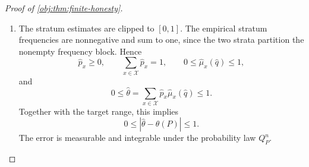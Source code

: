 \documentclass[11pt]{article}
\begin{document}
\begin{proof}[Proof of \cref{obj:thm:finite-honesty}]
\begin{enumerate}
The selection rule in \cref{obj:def:total-estimator} gives
\[
\widehat q\in\mathcal D_{n,\sigma},
\qquad
A_{\widehat q}(K)\le A_q(K)
\quad\text{for every }q\in\mathcal D_{n,\sigma}.
\]
By the admissibility assertion of \cref{obj:lem:dictionary-score-rate}, the selected pair satisfies the measurability and pointwise inversion conditions, together with
\[
\widehat q(t)\ge0\quad(t\in[-1/2,1/2]),
\qquad
0<I_\kappa(\widehat q)<\infty,
\qquad
V_{\widehat q}^{(16)}<\infty,
\qquad
E_P|\ell_{\widehat q}(V)|<\infty.
\]
Its public denominator and bias bounds have the formulas
\[
b_{\widehat q}(K)
=p_{\min}c_{\mathrm{lo}}I_\kappa(\widehat q)>0,
\qquad
B_{\widehat q}(K)
=\frac{c_{\mathrm{hi}}}{c_{\mathrm{lo}}I_\kappa(\widehat q)}
  \int_{-1/2}^{1/2}|t|^{\kappa+\beta}\widehat q(t)\,dt
\ge0.
\]
Here the bias bound is nonnegative because its integrand is nonnegative. Thus the score formula in \cref{obj:synth_4} gives
\[
A_{\widehat q}(K)
=
B_{\widehat q}(K)
+\frac{12}{b_{\widehat q}(K)}\sqrt{\frac{V_{\widehat q}(K)}{n}}
+2\sqrt{\frac3n}
\ge2\sqrt{\frac3n}>0.
\]
The product experiment satisfies the sampling condition in \cref{obj:ass:iid}. Applying \cref{obj:lem:public-error-certificate} to the selected pair, and using
\(\widehat\theta=\widehat\theta_{\widehat q}\) on nonempty blocks, therefore gives
\[
E_{Q_P^n}\!\left[|\widehat\theta-\theta(P)|\right]
\le A_{\widehat q}(K).
\]

\item The stratum estimates are clipped to \([0,1]\). The empirical stratum frequencies are nonnegative and sum to one, since the two strata partition the nonempty frequency block. Hence
\[
\widehat p_x\ge0,\qquad
\sum_{x\in\mathcal X}\widehat p_x=1,\qquad
0\le\widehat\mu_x(\widehat q)\le1,
\]
and
\[
0
\le
\widehat\theta
=\sum_{x\in\mathcal X}\widehat p_x\widehat\mu_x(\widehat q)
\le1.
\]
Together with the target range, this implies
\[
0\le|\widehat\theta-\theta(P)|\le1.
\]
The error is measurable and integrable under the probability law \(Q_P^n\).


\end{enumerate}
\end{proof}
\end{document}

